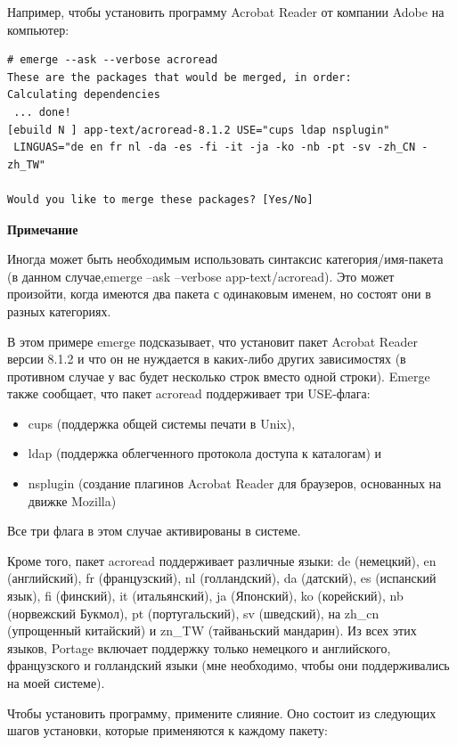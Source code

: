 \documentclass[10pt]{book}
\begin{document}
Например, чтобы установить программу Acrobat Reader от компании Adobe на компьютер:
\begin{tcolorbox}
\begin{lstlisting}
# emerge --ask --verbose acroread
These are the packages that would be merged, in order:
Calculating dependencies
 ... done!
[ebuild N ] app-text/acroread-8.1.2 USE="cups ldap nsplugin"
 LINGUAS="de en fr nl -da -es -fi -it -ja -ko -nb -pt -sv -zh_CN -zh_TW"

Would you like to merge these packages? [Yes/No]
\end{lstlisting}
\end{tcolorbox}

\begin{tcolorbox}
\textbf{Примечание}

   Иногда может быть необходимым использовать синтаксис категория/имя-пакета (в данном случае,emerge --ask --verbose app-text/acroread). Это может произойти, когда имеются два пакета с одинаковым именем, но состоят они в разных категориях.
\end{tcolorbox}

В этом примере emerge подсказывает, что установит пакет Acrobat Reader версии 8.1.2 и что он не нуждается в каких-либо других зависимостях (в противном случае у вас будет несколько строк вместо одной строки). Emerge также сообщает, что пакет acroread поддерживает три USE-флага:
\begin{itemize}
\item cups (поддержка общей системы печати в Unix),
\item ldap (поддержка облегченного протокола доступа к каталогам) и
\item nsplugin (создание плагинов Acrobat Reader для браузеров, основанных на движке Mozilla)
\end{itemize}

Все три флага в этом случае активированы в системе.

Кроме того, пакет acroread поддерживает различные языки: de (немецкий), en (английский), fr (французский), nl (голландский), da (датский), es (испанский язык), fi (финский), it (итальянский), ja (Японский), ko (корейский), nb (норвежский Букмол), pt (португальский), sv (шведский), на zh\_cn (упрощенный китайский) и zn\_TW
(тайваньский мандарин). Из всех этих языков, Portage включает поддержку только немецкого и английского, французского и голландский языки (мне необходимо, чтобы они поддерживались на моей системе).

Чтобы установить программу, примените слияние. Оно состоит из следующих шагов установки, которые применяются к каждому пакету:
\end{document}
